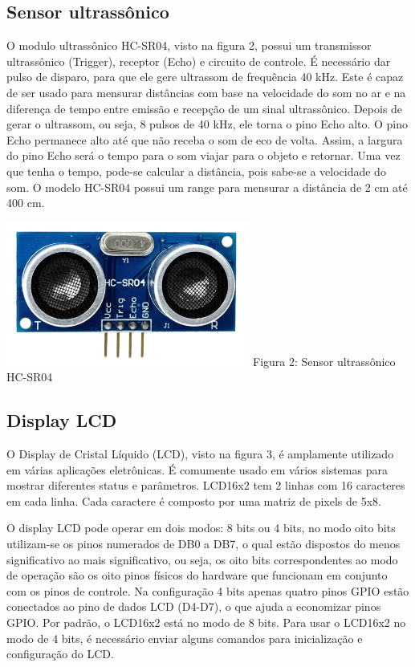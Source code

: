 \documentclass[conference]{IEEEtran}
\begin{document}
\subsection{Sensor ultrassônico}
 O modulo ultrassônico HC-SR04, visto na figura 2, possui um transmissor ultrassônico (Trigger), receptor (Echo) e circuito de controle. É necessário dar pulso de disparo, para que ele gere ultrassom de frequência 40 kHz. Este é capaz de ser usado para mensurar distâncias com base na velocidade do som no ar e na diferença de tempo entre emissão e recepção de um sinal ultrassônico. Depois de gerar o ultrassom, ou seja, 8 pulsos de 40 kHz, ele torna o pino Echo alto. O pino Echo permanece alto até que não receba o som de eco de volta. Assim, a largura do pino Echo será o tempo para o som viajar para o objeto e retornar. Uma vez que tenha o tempo, pode-se calcular a distância, pois sabe-se a velocidade do som. O modelo HC-SR04 possui um range para mensurar a distância de 2 cm até 400 cm.
 \begin{center}
    \includegraphics[width=8cm]{Sensor.png}
    Figura 2: Sensor ultrassônico HC-SR04
\end{center}
\subsection{Display LCD}
O Display de Cristal Líquido (LCD), visto na figura 3, é amplamente utilizado em várias aplicações eletrônicas. É comumente usado em vários sistemas para mostrar diferentes status e parâmetros. LCD16x2 tem 2 linhas com 16 caracteres em cada linha. Cada caractere é composto por uma matriz de pixels de 5x8.

O display LCD pode operar em dois modos: 8 bits ou 4 bits, no modo oito bits utilizam-se os pinos numerados de DB0 a DB7, o qual estão dispostos do menos significativo ao mais significativo, ou seja,  os oito bits correspondentes ao modo de operação são os oito pinos físicos do hardware que funcionam em conjunto com os pinos de controle. Na configuração 4 bits apenas quatro pinos GPIO estão conectados ao pino de dados LCD (D4-D7), o que ajuda a economizar pinos GPIO. Por padrão, o LCD16x2 está no modo de 8 bits. Para usar o LCD16x2 no modo de 4 bits, é necessário enviar alguns comandos para inicialização e configuração do LCD.
\end{document}
